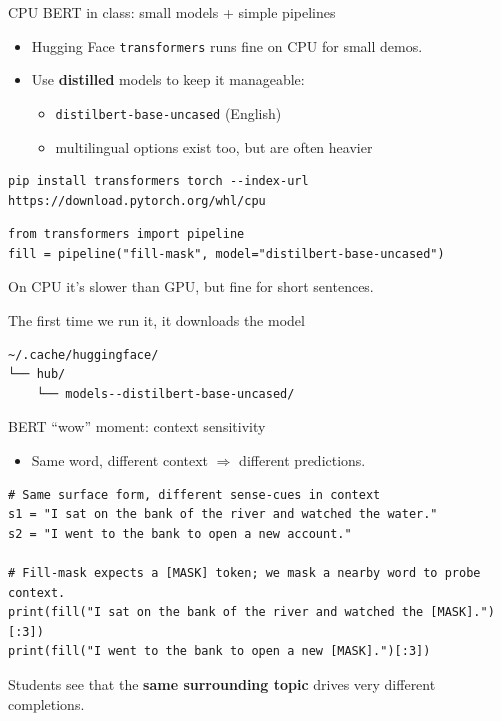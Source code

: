 \documentclass[aspectratio=169]{beamer}
\begin{document}
\begin{frame}[fragile]{CPU BERT in class: small models + simple pipelines}
\begin{itemize}
  \item Hugging Face \texttt{transformers} runs fine on CPU for small demos.
  \item Use \textbf{distilled} models to keep it manageable:
    \begin{itemize}
      \item \texttt{distilbert-base-uncased} (English)
      \item multilingual options exist too, but are often heavier
    \end{itemize}
\end{itemize}

\begin{verbatim}
pip install transformers torch --index-url https://download.pytorch.org/whl/cpu
\end{verbatim}

\begin{verbatim}
from transformers import pipeline
fill = pipeline("fill-mask", model="distilbert-base-uncased")
\end{verbatim}

\small
On CPU it’s slower than GPU, but fine for short sentences.

The first time we run it, it downloads the model
\begin{verbatim}
~/.cache/huggingface/
└── hub/
    └── models--distilbert-base-uncased/
\end{verbatim}

\end{frame}

\begin{frame}[fragile]{BERT “wow” moment: context sensitivity}
\begin{itemize}
  \item Same word, different context $\Rightarrow$ different predictions.
\end{itemize}

\begin{verbatim}
# Same surface form, different sense-cues in context
s1 = "I sat on the bank of the river and watched the water."
s2 = "I went to the bank to open a new account."

# Fill-mask expects a [MASK] token; we mask a nearby word to probe context.
print(fill("I sat on the bank of the river and watched the [MASK].")[:3])
print(fill("I went to the bank to open a new [MASK].")[:3])
\end{verbatim}

\small
Students see that the \textbf{same surrounding topic} drives very different completions.
\end{frame}
\end{document}
